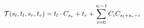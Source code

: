 \begin{equation}  \label{fun:tid}
  {\cal T}(s_l, t_l, s_r, t_r)
    = t_l \cdot C_{s_r} + t_r + 
          \sum_{i = 0}^{s_l - 1} C_i C_{s_l + s_r - i}
\end{equation}
